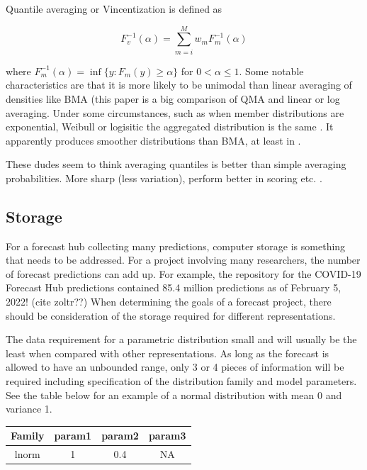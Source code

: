 \documentclass{article}\usepackage[]{graphicx}\usepackage[]{color}
\begin{document}
Quantile averaging or Vincentization is defined as 

\begin{equation}
  F_v^{-1}(\alpha) = \sum_{m=i}^M w_m F_m^{-1} (\alpha)
\end{equation}

where $F_m^{-1} (\alpha) = \inf \{y:F_m(y) \geq \alpha\}$ for 
$0 < \alpha \leq 1$. Some notable characteristics are that it is more likely
to be unimodal than linear averaging of densities like BMA 
\cite{busetti2017quantile} (this paper is a big comparison of QMA and 
linear or log averaging. Under some circumstances, such as when member
distributions are exponential, Weibull or logisitic the aggregated distribution
is the same \cite{ratcliff1979group}. It apparently produces smoother
distributions than BMA, at least in \cite{schepen2015model}.

These dudes seem to think averaging quantiles is better than simple averaging 
probabilities. More sharp (less variation), perform better in scoring etc.
\cite{lichtendahl2013better}.


\subsection{Storage}
For a forecast hub collecting many predictions, computer storage is something
that needs to be addressed. For a project involving many researchers, the 
number of forecast predictions can add up. For example, the repository for the
COVID-19 Forecast Hub predictions contained 85.4 million predictions as of 
February 5, 2022! (cite zoltr??)
When determining the goals of a forecast project, there should be consideration 
of the storage required for different representations.

The data requirement for a parametric distribution small and will usually be the 
least when compared with other representations. As long as the forecast is 
allowed to have an unbounded range, only 3 or 4 pieces of information will be
required including specification of the distribution family and model 
parameters. See the table below for an example of a normal distribution with 
mean 0 and variance 1.

\begin{table}[h!]
\centering
 \begin{tabular}{||c c c c||} 
 \hline
 Family & param1 & param2 & param3 \\ [0.5ex] 
 \hline\hline
 lnorm & 1 & 0.4 & NA \\ 
 \hline
 \end{tabular}
\end{table}
\end{document}
